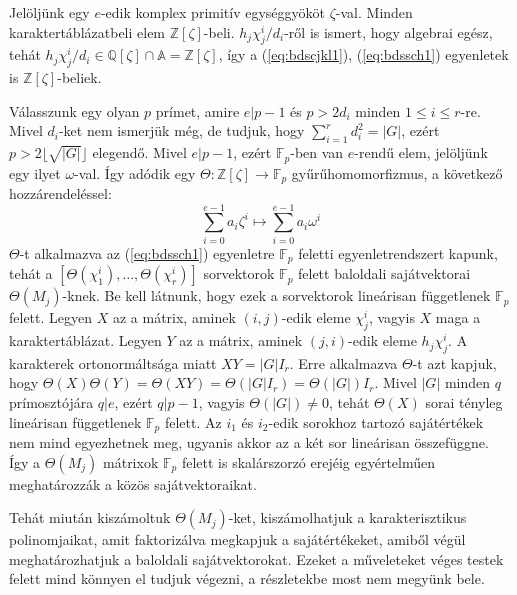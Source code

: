 Jelöljünk egy $e$-edik komplex primitív egységgyököt $\zeta$-val. Minden karaktertáblázatbeli elem $\mathbb{Z}[\zeta]$-beli.
$h_j\chi^i_j/d_i$-ről is ismert, hogy algebrai egész, tehát $h_j\chi^i_j/d_i \in \mathbb{Q}[\zeta] \cap \mathbb{A} = \mathbb{Z}[\zeta]$, így a
(\ref{eq:bdscjkl1}), (\ref{eq:bdssch1}) egyenletek is $\mathbb{Z}[\zeta]$-beliek.

Válasszunk egy olyan $p$ prímet, amire $e|p-1$ és $p > 2 d_i$ minden $1\le i\le r$-re. Mivel $d_i$-ket nem ismerjük még, de tudjuk, hogy 
$\sum_{i=1}^r d_i^2 = |G|$, ezért $p > 2\lfloor \sqrt{|G|} \rfloor$ elegendő. Mivel $e|p-1$, ezért $\mathbb{F}_p$-ben van $e$-rendű elem, jelöljünk
egy ilyet $\omega$-val. Így adódik egy $\Theta : \mathbb{Z}[\zeta] \to \mathbb{F}_p$ gyűrűhomomorfizmus, a következő hozzárendeléssel:
\begin{equation*}
\sum_{i=0}^{e-1} a_i \zeta^i \mapsto \sum_{i=0}^{e-1} a_i \omega^i
\end{equation*}
$\Theta$-t alkalmazva az (\ref{eq:bdssch1}) egyenletre $\mathbb{F}_p$ feletti egyenletrendszert kapunk,
tehát a $[\Theta(\chi^i_1), \dots, \Theta(\chi^i_r)]$ sorvektorok $\mathbb{F}_p$ felett baloldali sajátvektorai $\Theta(M_j)$-knek.
Be kell látnunk, hogy ezek a sorvektorok lineárisan függetlenek $\mathbb{F}_p$ felett.
Legyen $X$ az a mátrix, aminek $(i, j)$-edik eleme $\chi^i_j$, vagyis $X$ maga a karaktertáblázat.
Legyen $Y$ az a mátrix, aminek $(j, i)$-edik eleme $h_j\chi^i_j$.
A karakterek ortonormáltsága miatt $XY=|G|I_r$.
Erre alkalmazva $\Theta$-t azt kapjuk, hogy $\Theta(X)\Theta(Y)=\Theta(XY)=\Theta(|G|I_r)=\Theta(|G|)I_r$.
Mivel $|G|$ minden $q$ prímosztójára $q|e$, ezért $q|p-1$, vagyis $\Theta(|G|)\ne 0$, tehát $\Theta(X)$ sorai tényleg lineárisan függetlenek $\mathbb{F}_p$ felett.
Az $i_1$ és $i_2$-edik sorokhoz tartozó sajátértékek nem mind egyezhetnek meg, ugyanis akkor az a két sor lineárisan összefüggne.
Így a $\Theta(M_j)$ mátrixok $\mathbb{F}_p$ felett is skalárszorzó erejéig egyértelműen meghatározzák a közös sajátvektoraikat.

Tehát miután kiszámoltuk $\Theta(M_j)$-ket, kiszámolhatjuk a karakterisztikus polinomjaikat, amit faktorizálva megkapjuk a sajátértékeket, amiből végül meghatározhatjuk a baloldali sajátvektorokat.
Ezeket a műveleteket véges testek felett mind könnyen el tudjuk végezni, a részletekbe most nem megyünk bele.

